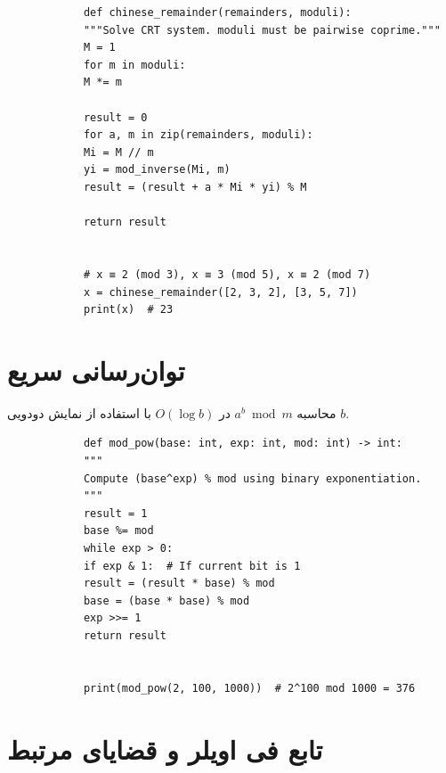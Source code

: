 \documentclass{matinbook}
\begin{document}
    \begin{latin}
        \begin{verbatim}
            def chinese_remainder(remainders, moduli):
            """Solve CRT system. moduli must be pairwise coprime."""
            M = 1
            for m in moduli:
            M *= m
            
            result = 0
            for a, m in zip(remainders, moduli):
            Mi = M // m
            yi = mod_inverse(Mi, m)
            result = (result + a * Mi * yi) % M
            
            return result
            
            
            # x ≡ 2 (mod 3), x ≡ 3 (mod 5), x ≡ 2 (mod 7)
            x = chinese_remainder([2, 3, 2], [3, 5, 7])
            print(x)  # 23
        \end{verbatim}
    \end{latin}
    \label{code:crt}
    
    \section{توان‌رسانی سریع}
    
    \begin{definition}
        محاسبه $a^{b} \bmod m$ در $O(\log b)$
        با استفاده از نمایش دودویی $b$.
        \label{def:fast-exponentiation}
    \end{definition}
    
    \begin{latin}
        \begin{verbatim}
            def mod_pow(base: int, exp: int, mod: int) -> int:
            """
            Compute (base^exp) % mod using binary exponentiation.
            """
            result = 1
            base %= mod
            while exp > 0:
            if exp & 1:  # If current bit is 1
            result = (result * base) % mod
            base = (base * base) % mod
            exp >>= 1
            return result
            
            
            print(mod_pow(2, 100, 1000))  # 2^100 mod 1000 = 376
        \end{verbatim}
    \end{latin}
    \label{code:mod-pow}
    
    \section{تابع فی اویلر و قضایای مرتبط}
    
\end{document}
